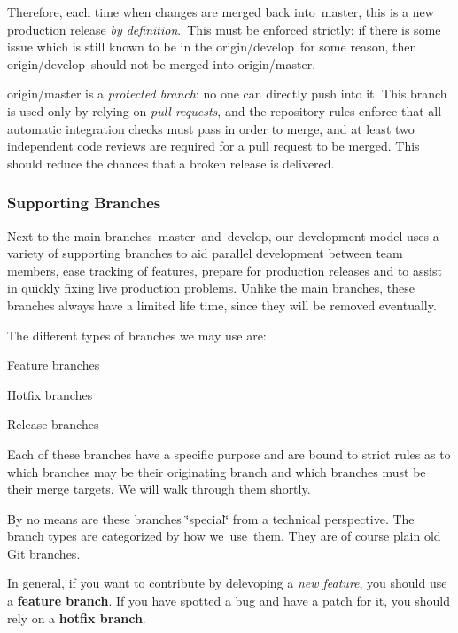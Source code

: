 Therefore, each time when changes are merged back into {\ttfamily master}, this is a new production release {\itshape by definition}. \+This must be enforced strictly\+: if there is some issue which is still known to be in the {\ttfamily origin/develop} for some reason, then {\ttfamily origin/develop} should not be merged into {\ttfamily origin/master}.

{\ttfamily origin/master} is a {\itshape protected branch}\+: no one can directly push into it. This branch is used only by relying on {\itshape pull requests}, and the repository rules enforce that all automatic integration checks must pass in order to merge, and at least two independent code reviews are required for a pull request to be merged. This should reduce the chances that a broken release is delivered.

\subsubsection*{Supporting Branches}

Next to the main branches {\ttfamily master} and {\ttfamily develop}, our development model uses a variety of supporting branches to aid parallel development between team members, ease tracking of features, prepare for production releases and to assist in quickly fixing live production problems. Unlike the main branches, these branches always have a limited life time, since they will be removed eventually.

The different types of branches we may use are\+:


\begin{DoxyItemize}
\item Feature branches
\item Hotfix branches
\item Release branches
\end{DoxyItemize}

Each of these branches have a specific purpose and are bound to strict rules as to which branches may be their originating branch and which branches must be their merge targets. We will walk through them shortly.

By no means are these branches \char`\"{}special\char`\"{} from a technical perspective. The branch types are categorized by how we use them. They are of course plain old Git branches.

In general, if you want to contribute by delevoping a {\itshape new feature}, you should use a {\bfseries feature branch}. If you have spotted a bug and have a patch for it, you should rely on a {\bfseries hotfix branch}.

